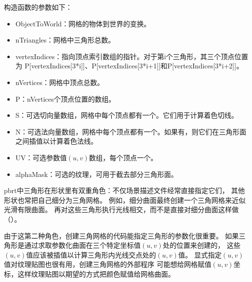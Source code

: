 构造函数的参数如下：
\begin{itemize}
    \item {\ttfamily ObjectToWorld}：网格的物体到世界的变换。
    \item {\ttfamily nTriangles}：网格中三角形总数。
    \item {\ttfamily vertexIndices}：指向顶点索引数组的指针。对于第{\ttfamily i}个三角形，其三个顶点位置为
          {\ttfamily P[vertexIndices[3*i]]}、{\ttfamily P[vertexIndices[3*i+1]]}和{\ttfamily P[vertexIndices[3*i+2]]}。
    \item {\ttfamily nVertices}：网格中顶点总数。
    \item {\ttfamily P}：{\ttfamily nVertices}个顶点位置的数组。
    \item {\ttfamily S}：可选切向量数组，网格中每个顶点都有一个。它们用于计算着色切线。
    \item {\ttfamily N}：可选法向量数组，网格中每个顶点都有一个。如果有，则它们在三角形面之间插值以计算着色法线。
    \item {\ttfamily UV}：可选参数值$(u,v)$数组，每个顶点一个。
    \item {\ttfamily alphaMask}：可选的纹理，可用于截去部分三角形面。
\end{itemize}

pbrt中三角形在形状里有双重角色：不仅场景描述文件经常直接指定它们，
其他形状也常把自己细分为三角网格。
例如，细分曲面最终创建一个三角网格来近似光滑有限曲面。
再对这些三角形执行光线相交，而不是直接对细分曲面这样做（）。

由于这第二种角色，创建三角网格的代码能指定三角形的参数化很重要。
如果三角形是通过求取参数化曲面在三个特定坐标值$(u,v)$处的位置来创建的，
这些$(u,v)$值应该被插值以计算三角形内光线交点处的$(u,v)$值。
显式指定$(u,v)$值对纹理贴图也很有用，创建三角网格的外部程序
可能想给网格赋值$(u,v)$坐标，这样纹理贴图以期望的方式把颜色赋值给网格曲面。

